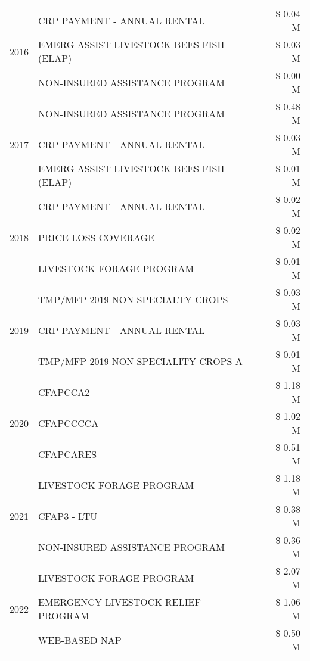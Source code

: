 \begin{tabular}{llr}
\cline{1-3}
\multirow[t]{3}{*}{2016} & CRP PAYMENT - ANNUAL RENTAL & \$ 0.04 M \\
 & EMERG ASSIST LIVESTOCK BEES FISH (ELAP) & \$ 0.03 M \\
 & NON-INSURED ASSISTANCE PROGRAM & \$ 0.00 M \\
\cline{1-3}
\multirow[t]{3}{*}{2017} & NON-INSURED ASSISTANCE PROGRAM & \$ 0.48 M \\
 & CRP PAYMENT - ANNUAL RENTAL & \$ 0.03 M \\
 & EMERG ASSIST LIVESTOCK BEES FISH (ELAP) & \$ 0.01 M \\
\cline{1-3}
\multirow[t]{3}{*}{2018} & CRP PAYMENT - ANNUAL RENTAL & \$ 0.02 M \\
 & PRICE LOSS COVERAGE & \$ 0.02 M \\
 & LIVESTOCK FORAGE PROGRAM & \$ 0.01 M \\
\cline{1-3}
\multirow[t]{3}{*}{2019} & TMP/MFP 2019 NON SPECIALTY CROPS & \$ 0.03 M \\
 & CRP PAYMENT - ANNUAL RENTAL & \$ 0.03 M \\
 & TMP/MFP 2019 NON-SPECIALITY CROPS-A & \$ 0.01 M \\
\cline{1-3}
\multirow[t]{3}{*}{2020} & CFAPCCA2 & \$ 1.18 M \\
 & CFAPCCCCA & \$ 1.02 M \\
 & CFAPCARES & \$ 0.51 M \\
\cline{1-3}
\multirow[t]{3}{*}{2021} & LIVESTOCK FORAGE PROGRAM & \$ 1.18 M \\
 & CFAP3 - LTU & \$ 0.38 M \\
 & NON-INSURED ASSISTANCE PROGRAM & \$ 0.36 M \\
\cline{1-3}
\multirow[t]{3}{*}{2022} & LIVESTOCK FORAGE PROGRAM & \$ 2.07 M \\
 & EMERGENCY LIVESTOCK RELIEF PROGRAM & \$ 1.06 M \\
 & WEB-BASED NAP & \$ 0.50 M \\
\cline{1-3}
\bottomrule
\end{tabular}
